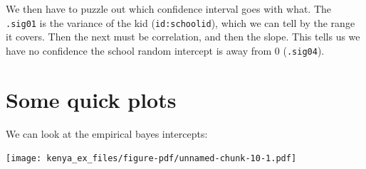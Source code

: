 \documentclass[
  letterpaper,
  DIV=11,
  numbers=noendperiod]{scrreprt}
\newenvironment{Shaded}{}{}
\newcommand{\AttributeTok}[1]{\textcolor[rgb]{0.49,0.56,0.16}{#1}}
\newcommand{\FunctionTok}[1]{\textcolor[rgb]{0.02,0.16,0.49}{#1}}
\newcommand{\NormalTok}[1]{#1}
\newcommand{\OtherTok}[1]{\textcolor[rgb]{0.00,0.44,0.13}{#1}}
\newcommand{\SpecialCharTok}[1]{\textcolor[rgb]{0.25,0.44,0.63}{#1}}
\newcommand{\StringTok}[1]{\textcolor[rgb]{0.25,0.44,0.63}{#1}}
\begin{document}
We then have to puzzle out which confidence interval goes with what. The
\texttt{.sig01} is the variance of the kid (\texttt{id:schoolid}), which
we can tell by the range it covers. Then the next must be correlation,
and then the slope. This tells us we have no confidence the school
random intercept is away from 0 (\texttt{.sig04}).

\section{Some quick plots}\label{some-quick-plots}

We can look at the empirical bayes intercepts:

\begin{Shaded}
\end{Shaded}

\texttt{[image: kenya\_ex\_files/figure-pdf/unnamed-chunk-10-1.pdf]}
\end{document}
